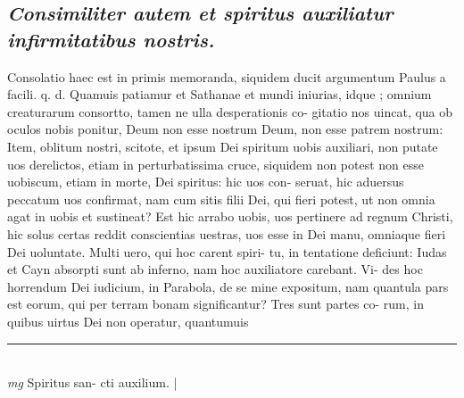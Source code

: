 \documentclass{article}
\begin{document}
\begin{pages}
\subsection*{\textit{Consimiliter autem et spiritus auxiliatur infirmitatibus nostris. }}\pstart Consolatio haec est in primis memoranda, siquidem ducit argumentum Paulus a facili. q. d. Quamuis patiamur et Sathanae et mundi iniurias, idque ; omnium creaturarum consortto, tamen ne ulla desperationis co- gitatio nos uincat, qua ob oculos nobis ponitur, Deum non esse nostrum Deum, non esse patrem nostrum: Item, oblitum nostri, scitote, et ipsum Dei spiritum uobis auxiliari, non putate uos derelictos, etiam in perturbatissima cruce, siquidem non potest non esse uobiscum, etiam in morte, Dei spiritus: hic uos con- seruat, hic aduersus peccatum uos confirmat, nam cum sitis filii Dei, qui fieri potest, ut non omnia agat in uobis et sustineat? Est hic arrabo uobis, uos pertinere ad regnum Christi, hic solus certas reddit conscientias uestras, uos esse in Dei manu, omniaque  fieri Dei uoluntate. Multi uero, qui hoc carent spiri- tu, in tentatione deficiunt: Iudas et Cayn absorpti sunt ab inferno, nam hoc auxiliatore carebant. Vi- des hoc horrendum Dei iudicium, in Parabola, de se mine expositum, nam quantula pars est eorum, qui per terram bonam significantur? Tres sunt partes co- rum, in quibus uirtus Dei non operatur, quantumuis  \pend
\vspace{0.5cm}\noindent
\vspace{0.2cm}\rule{1cm}{0.2pt}\\ 
\hspace{0.2cm}\textit{mg}
\footnotesize Spiritus san- cti auxilium.  
\normalsize| 

\end{pages}
\end{document}
